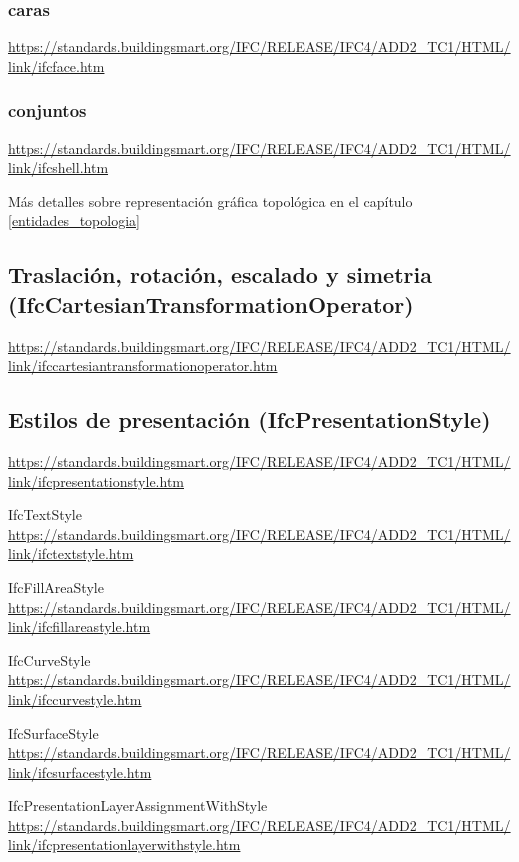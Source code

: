 \documentclass[spanish,12pt,a4paper,final,oneside]{book}
\begin{document}
\subsubsection{caras}
\url{https://standards.buildingsmart.org/IFC/RELEASE/IFC4/ADD2_TC1/HTML/link/ifcface.htm} 

\subsubsection{conjuntos}
\url{https://standards.buildingsmart.org/IFC/RELEASE/IFC4/ADD2_TC1/HTML/link/ifcshell.htm}

\vspace{0.5cm}
Más detalles sobre representación gráfica topológica en el capítulo \ref{entidades_topologia}



\subsection{Traslación, rotación, escalado y simetria \\ (IfcCartesianTransformationOperator)}
\url{https://standards.buildingsmart.org/IFC/RELEASE/IFC4/ADD2_TC1/HTML/link/ifccartesiantransformationoperator.htm}



\subsection{Estilos de presentación (IfcPresentationStyle)}
\url{https://standards.buildingsmart.org/IFC/RELEASE/IFC4/ADD2_TC1/HTML/link/ifcpresentationstyle.htm}

IfcTextStyle
\\ \url{https://standards.buildingsmart.org/IFC/RELEASE/IFC4/ADD2_TC1/HTML/link/ifctextstyle.htm}

IfcFillAreaStyle
\\ \url{https://standards.buildingsmart.org/IFC/RELEASE/IFC4/ADD2_TC1/HTML/link/ifcfillareastyle.htm}

IfcCurveStyle
\\ \url{https://standards.buildingsmart.org/IFC/RELEASE/IFC4/ADD2_TC1/HTML/link/ifccurvestyle.htm}

IfcSurfaceStyle
\\ \url{https://standards.buildingsmart.org/IFC/RELEASE/IFC4/ADD2_TC1/HTML/link/ifcsurfacestyle.htm}

IfcPresentationLayerAssignmentWithStyle
\\ \url{https://standards.buildingsmart.org/IFC/RELEASE/IFC4/ADD2_TC1/HTML/link/ifcpresentationlayerwithstyle.htm}
\end{document}
